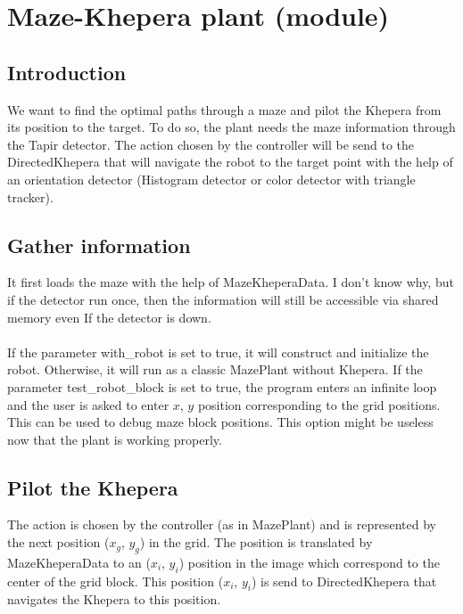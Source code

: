 \section{Maze-Khepera plant (module)}
\label{sec:mkp}

\subsection{Introduction}
\label{sec:mkp:intro}

We want to find the optimal paths through a maze and pilot the Khepera 
from its position to the target. To do so, the plant needs the maze 
information through the Tapir detector. The action chosen by the 
controller will be send to the DirectedKhepera that will navigate the 
robot
to the target point with the help of an orientation detector 
(Histogram detector or color detector with triangle tracker).

\subsection{Gather information}
\label{sec:mkp:gather}

It first loads the maze with the help of MazeKheperaData. I don't know 
why, but if the detector run once, then the information will still 
be accessible via shared memory even If the detector is down. 
\\
\\
If the parameter with\_robot is set to true, it will construct and 
initialize the robot. Otherwise, it will run as a classic MazePlant 
without Khepera.
If the parameter test\_robot\_block is set to true, the program enters an 
infinite loop and the user is asked to enter $x$, $y$ position 
corresponding 
to the grid positions. This can be used to debug maze block positions. 
This option might be useless now that the plant is working properly.

\subsection{Pilot the Khepera}
\label{sec:mkp:pilot}

The action is chosen by the controller (as in MazePlant) and 
is represented by the next position ($x_g$, $y_g$) in the grid. 
The position is translated by MazeKheperaData to an ($x_i$, $y_i$) position 
in the image which correspond to the center of the grid block. This 
position ($x_i$, $y_i$) is send to DirectedKhepera that navigates the 
Khepera to this position.

